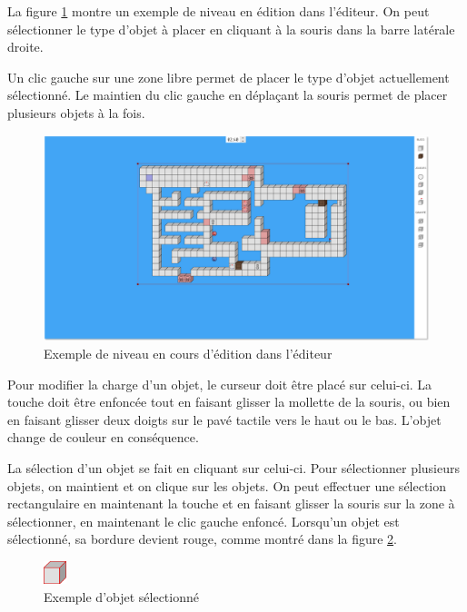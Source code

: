 La figure \ref{fig:manuel-editeur-example} montre un exemple de niveau
en édition dans l'éditeur. On peut sélectionner le type d'objet à placer
en cliquant à la souris dans la barre latérale droite.

Un clic gauche sur une zone libre permet de placer le type d'objet
actuellement sélectionné. Le maintien du clic gauche en déplaçant la
souris permet de placer plusieurs objets à la fois.

\begin{figure}[h]
    \centering
    \includegraphics[width=13cm]{figures/manuel-editor.png}
    \caption{Exemple de niveau en cours d'édition dans l'éditeur}
    \label{fig:manuel-editeur-example}
\end{figure}

Pour modifier la charge d'un objet, le curseur doit être placé sur
celui-ci. La touche  doit être enfoncée tout en faisant
glisser la mollette de la souris, ou bien en faisant glisser deux
doigts sur le pavé tactile vers le haut ou le bas. L'objet change
de couleur en conséquence.

La sélection d'un objet se fait en cliquant sur celui-ci. Pour sélectionner
plusieurs objets, on maintient  et on clique sur les objets.
On peut effectuer une sélection rectangulaire en maintenant la touche
 et en faisant glisser la souris sur la zone à sélectionner,
en maintenant le clic gauche enfoncé. Lorsqu'un objet est sélectionné, sa
bordure devient rouge, comme montré dans la figure \ref{fig:manuel-selection}.

\begin{figure}[h]
    \centering
    \includegraphics[width=25px]{figures/manuel-selected-block.png}
    \caption{Exemple d'objet sélectionné}
    \label{fig:manuel-selection}
\end{figure}

